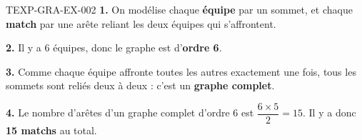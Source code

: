 \begin{corrige}{TEXP-GRA-EX-002}
\textbf{1.} On modélise chaque \textbf{équipe} par un sommet, et chaque \textbf{match} par une arête reliant les deux équipes qui s'affrontent.

\textbf{2.} Il y a $6$ équipes, donc le graphe est d'\textbf{ordre 6}.

\textbf{3.} Comme chaque équipe affronte toutes les autres exactement une fois, tous les sommets sont reliés deux à deux : c'est un \textbf{graphe complet}.

\textbf{4.} Le nombre d'arêtes d'un graphe complet d'ordre $6$ est $\dfrac{6\times5}{2}=15$. Il y a donc \textbf{15 matchs} au total.
\end{corrige}
